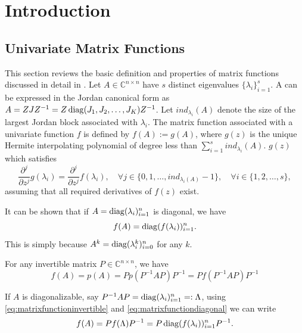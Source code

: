 \section{Introduction}


\subsection{Univariate Matrix Functions}
This section reviews the basic definition and properties of matrix functions discussed in detail in
\cite{higham2008functions}.
Let $A \in \mathbb{C}^{n \times n}$ have $s$ distinct eigenvalues $\{\lambda_i\}_{i=1}^{s}$. A can be
expressed in the Jordan canonical form as $A = ZJZ^{-1} = Z \operatorname{diag}(J_1, J_2, \dots, J_K) Z^{-1}$. Let
$ind_{\lambda_i}(A)$ denote the size of the largest Jordan block associated with $\lambda_i$. The matrix
function associated with a univariate function $f$ is defined by $f(A) := g(A)$, where $g(z)$ is the unique
Hermite interpolating polynomial of degree less than $\sum_{i=1}^{s}{ind_{\lambda_i}(A)}$. $g(z)$ which
satisfies
\begin{equation}
    \frac{\partial^j}{\partial z^j}g(\lambda_i) = \frac{\partial^j}{\partial z^j}f(\lambda_i),
    \quad \forall j \in \{0, 1, \dots, ind_{\lambda_i(A)}-1\},
    \quad \forall i \in \{1, 2, \dots, s\},
\end{equation}
assuming that all required derivatives of $f(z)$ exist.

It can be shown that if $A = \operatorname{diag}(\lambda_i)_{i=1}^{n}$ is diagonal, we have
\begin{equation}
    \label{eq:matrixfunctiondiagonal}
    f(A) = \operatorname{diag}(f(\lambda_i))_{i=1}^{n}.
\end{equation}
This is simply because $A^k = \operatorname{diag}(\lambda_i^k)_{i=0}^{n}$ for any $k$.

For any invertible matrix $P \in \mathbb{C}^{n \times n}$, we have
\begin{equation}
    \label{eq:matrixfunctioninvertible}
    f(A) = p(A) = Pp(P^{-1}AP)P^{-1} = Pf(P^{-1}AP)P^{-1}
\end{equation}

If $A$ is diagonalizable, say $P^{-1}AP = \operatorname{diag}(\lambda_i)_{i=1}^{n} =: \Lambda$,
using \eqref{eq:matrixfunctioninvertible} and \eqref{eq:matrixfunctiondiagonal}
we can write
\begin{equation}
    f(A) = P f(\Lambda) P^{-1} = P \operatorname{diag}(f(\lambda_i))_{i=1}^{n} P^{-1}.
\end{equation}


